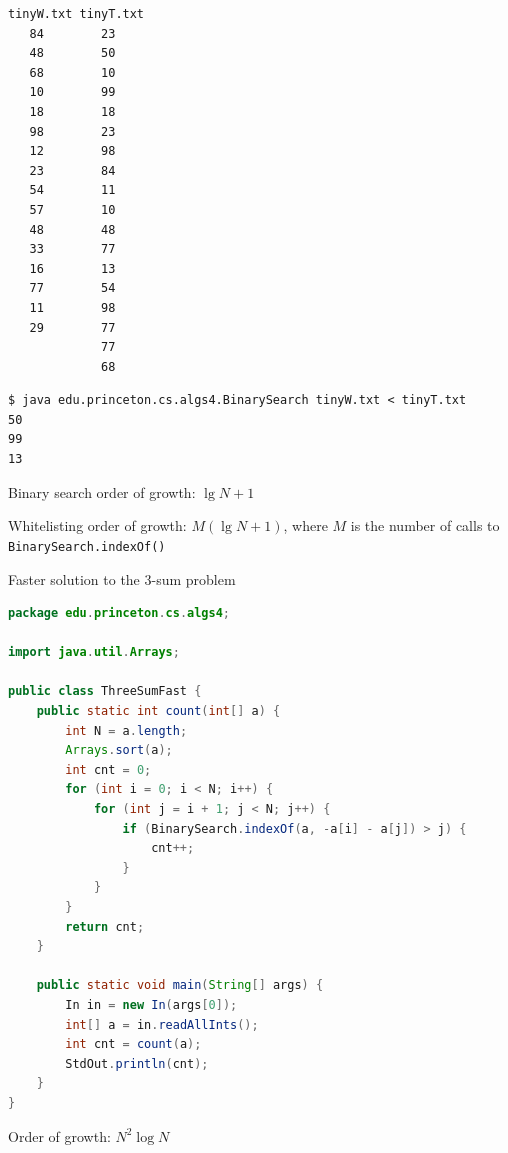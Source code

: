 \documentclass[8pt,a4paper,compress]{beamer}
\begin{document}
\begin{frame}[fragile]
\pause

\begin{lstlisting}[language={}]
tinyW.txt tinyT.txt
   84        23
   48        50
   68        10
   10        99
   18        18
   98        23
   12        98
   23        84
   54        11
   57        10
   48        48
   33        77
   16        13
   77        54
   11        98
   29        77
             77
             68
\end{lstlisting}

\pause

\begin{lstlisting}[language={}]
$ java edu.princeton.cs.algs4.BinarySearch tinyW.txt < tinyT.txt
50
99
13
\end{lstlisting}

\pause
\bigskip

Binary search order of growth: $\lg N + 1$ 

\pause
\bigskip

Whitelisting order of growth: $M(\lg N + 1)$, where $M$ is the number of calls to \lstinline{BinarySearch.indexOf()}
\end{frame}

\begin{frame}[fragile]
\pause

Faster solution to the 3-sum problem
\begin{lstlisting}[language=Java]
package edu.princeton.cs.algs4;

import java.util.Arrays;

public class ThreeSumFast {
    public static int count(int[] a) {
        int N = a.length;
        Arrays.sort(a);
        int cnt = 0;
        for (int i = 0; i < N; i++) {
            for (int j = i + 1; j < N; j++) {
                if (BinarySearch.indexOf(a, -a[i] - a[j]) > j) {
                    cnt++;
                }
            }
        }
        return cnt;
    }
    
    public static void main(String[] args) {
        In in = new In(args[0]);
        int[] a = in.readAllInts();
        int cnt = count(a);
        StdOut.println(cnt);
    }
}
\end{lstlisting}

\pause

Order of growth: $N^2\log N$
\end{frame}
\end{document}
